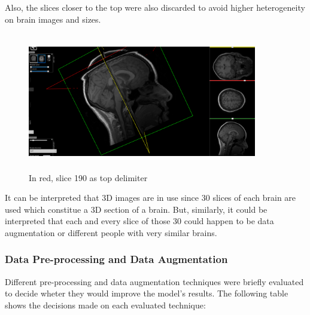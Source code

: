 Also, the slices closer to the top were also discarded to avoid higher heterogeneity on brain images and sizes.

\begin{figure}[ht]
    \centering
    \includegraphics[width = 10cm, height = 6cm]{images/nifti-slice190.png}
    \caption[]{In red, slice 190 as top delimiter}
    \label{fig:slice190}
\end{figure}

It can be interpreted that 3D images are in use since 30 slices of each brain are used which constitue a 3D section of a brain. But, similarly, it could be interpreted that each and every slice of those 30 could happen to be data augmentation or different people with very similar brains.

\subsubsection*{Data Pre-processing and Data Augmentation}

Different pre-processing and data augmentation techniques were briefly evaluated to decide wheter they would improve the model's results. The following table shows the decisions made on each evaluated technique:

